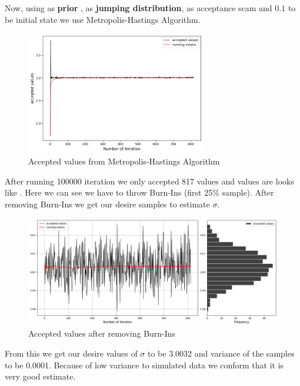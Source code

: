 \begin{example}
    Now, using  as \textbf{prior} ,  as \textbf{jumping distribution},  as acceptance scam and $0.1$ to be initial state we use Metropolis-Hastings Algorithm. 
    
    \begin{figure}[H]
        \centering
        \includegraphics[width=0.7\textwidth]{images/metropolis/example2-values.png}
        \caption{Accepted values from Metropolis-Hastings Algorithm}
        \label{fig:example2 values}
    \end{figure}

    After running 100000 iteration we only accepted 817 values and values are looks like . Here we can see we have to throw Burn-Ins (first 25\% sample). After removing Burn-Ins we get our desire samples to estimate $ \sigma $. 

    \begin{figure}[H]
        \centering
        \includegraphics[width=1\textwidth]{images/metropolis/example2-values-after-burnin.png}
        \caption{Accepted values after removing Burn-Ins}
    \end{figure}

    From this we get our desire values of $ \sigma $ to be 3.0032 and variance of the samples to be 0.0001. Because of low variance to simulated data we conform that it is very good estimate.


\end{example}
